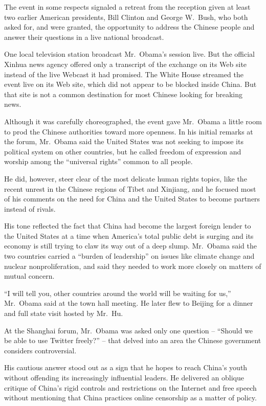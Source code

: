 ﻿\documentclass[12pt]{article}
\begin{document}
The event in some respects signaled a retreat from the reception given at least two earlier American
presidents, Bill Clinton and George W.~Bush, who both asked for, and were granted, the opportunity
to address the Chinese people and answer their questions in a live national broadcast.

One local television station broadcast Mr.~Obama's session live. But the official Xinhua news agency
offered only a transcript of the exchange on its Web site instead of the live Webcast it had
promised. The White House streamed the event live on its Web site, which did not appear to be
blocked inside China. But that site is not a common destination for most Chinese looking for
breaking news.

Although it was carefully choreographed, the event gave Mr.~Obama a little room to prod the Chinese
authorities toward more openness. In his initial remarks at the forum, Mr.~Obama said the United
States was not seeking to impose its political system on other countries, but he called freedom of
expression and worship among the ``universal rights'' common to all people.

He did, however, steer clear of the most delicate human rights topics, like the recent unrest in the
Chinese regions of Tibet and Xinjiang, and he focused most of his comments on the need for China and
the United States to become partners instead of rivals.

His tone reflected the fact that China had become the largest foreign lender to the United States at
a time when America's total public debt is surging and its economy is still trying to claw its way
out of a deep slump. Mr.~Obama said the two countries carried a ``burden of leadership'' on issues
like climate change and nuclear nonproliferation, and said they needed to work more closely on
matters of mutual concern.

``I will tell you, other countries around the world will be waiting for us,'' Mr.~Obama said at the
town hall meeting. He later flew to Beijing for a dinner and full state visit hosted by Mr.~Hu.

At the Shanghai forum, Mr.~Obama was asked only one question -- ``Should we be able to use Twitter
freely?'' -- that delved into an area the Chinese government considers controversial.

His cautious answer stood out as a sign that he hopes to reach China's youth without offending its
increasingly influential leaders. He delivered an oblique critique of China's rigid controls and
restrictions on the Internet and free speech without mentioning that China practices online
censorship as a matter of policy.
\end{document}
